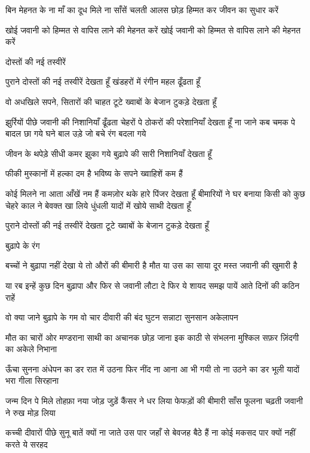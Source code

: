 बिन मेहनत के ना माँ का
दूध मिले ना साँसें चलती
आलस छोड़ हिम्मत कर
जीवन का सुधार करें

खोई जवानी को हिम्मत से
वापिस लाने की मेहनत करें
खोई जवानी को हिम्मत से
वापिस लाने की मेहनत करें







दोस्तों की नई तस्वीरें

पुराने दोस्तों की नई तस्वीरें देखता हूँ
खंडहरों में रंगीन महल ढूँढता हूँ

वो अधखिले सपने, सितारों की चाहत
टूटे ख्वाबों के बेजान टुकड़े देखता हूँ

झुर्रियों पीछे जवानी की निशानियाँ ढूँढता
चेहरों पे ठोकरों की परेशानियाँ देखता हूँ
ना जाने कब चमक पे बादल छा गये
घने बाल उड़े जो बचे रंग बदला गये

जीवन के थपेड़े सीधी कमर झुका गये
बुढ़ापे की सारी निशानियाँ देखता हूँ

फीकी मुस्कानों में हल्का दम है
भविष्य के सपने ख्वाहिशें कम हैं

कोई मिलने ना आता आँखें नम हैं
कमज़ोर थके हारे पिंजर देखता हूँ
बीमारियों ने घर बनाया किसी को
कुछ चेहरे काल ने बेवक्त खा लिये
धुंधली यादों में खोये साथी देखता हूँ

पुराने दोस्तों की नई तस्वीरें देखता
टूटे ख्वाबों के बेजान टुकड़े देखता हूँ




बुढ़ापे के रंग

बच्चों ने बुढ़ापा नहीं देखा
ये तो औरों की बीमारी है
मौत या उस का साया दूर
मस्त जवानी की खुमारी है





या रब इन्हें कुछ दिन बुढ़ापा
और फिर से जवानी लौटा दे
फिर ये शायद समझ पायें
आते दिनों की कठिन राहें

वो क्या जाने बुढ़ापे के गम
वो चार दीवारी की बंद घुटन
सन्नाटा सुनसान अकेलापन



मौत का चारों ओर मण्डराना
साथी का अचानक छोड़ जाना
इक काठी से संभलना मुश्किल
सफ़र ज़िंदगी का अकेले निभाना


ऊँचा सुनना अंधेपन का डर
रात में उठना फिर नींद ना आना
आ भी गयी तो ना उठने का डर
भूली यादों भरा गीला सिरहाना

जन्म दिन पे मिले तोहफ़ा नया
जोड़ जुड़ें कैंसर ने धर लिया
फेफड़ों की बीमारी साँस फूलना
चढ़ती जवानी ने रुख मोड़ लिया


कच्ची दीवारों पीछे सुनू बातें
क्यों ना जाते उस पार जहाँ से
बेवजह बैठे हैं ना कोई मकसद
पार क्यों नहीं करते ये सरहद

